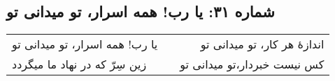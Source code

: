 \begin{center}
\section*{شماره ۳۱: یا رب! همه اسرار، تو میدانی تو}
\label{sec:031}
\begin{longtable}{l p{0.5cm} r}
یا رب! همه اسرار، تو میدانی تو
&&
اندازهٔ هر کار، تو میدانی تو
\\
زین سِرّ که در نهاد ما میگردد
&&
کس نیست خبردار،‌تو میدانی تو
\\
\end{longtable}
\end{center}

